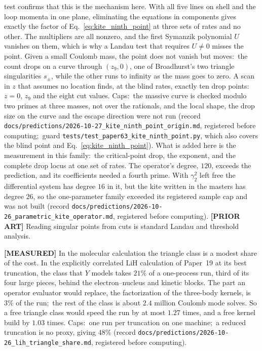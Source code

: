 \documentclass[aps,pra,twocolumn,superscriptaddress,longbibliography]{revtex4-2}
\begin{document}
test confirms that this is the mechanism here.  With all five lines on shell
and the loop momenta in one plane, eliminating the equations in components
gives exactly the factor of Eq.~\eqref{eq:kite_ninth_point} at three sets of
rates and no other.  The multipliers are all nonzero, and the first Symanzik
polynomial $U$ vanishes on them, which is why a Landau test that requires
$U\neq0$ misses the point.  Given a small Coulomb mass, the point does not
vanish but moves:\ the count drops on a curve through $(z_9,0)$, one of
Broadhurst's two triangle singularities $s_\pm$, while the other runs to infinity as the
mass goes to zero.  A scan in $z$ that assumes no location finds, at the blind
rates, exactly ten drop points:\ $z=0$, $z_9$ and the eight cut values.  Caps:\
the massive curve is checked modulo two primes at three masses, not over the
rationals, and the local shape, the drop size on the curve and the escape
direction were not run (record
\texttt{docs/predictions/2026-10-27\_kite\_ninth\_point\_origin.md}, registered
before computing;\ guard \texttt{tests/test\_paper63\_kite\_ninth\_point.py}, which also
covers the blind point and Eq.~\eqref{eq:kite_ninth_point}).  What is added here is the measurement in this family:\ the
critical-point drop, the exponent, and the complete drop locus at one set of
rates.  The operator's degree,
$120$, exceeds the prediction, and its coefficients needed a fourth prime.
With $\gamma_2^2$ left free the differential system has degree $16$ in it,
but the kite written in the masters has degree $26$, so the one-parameter
family exceeded its registered sample cap and was not built (record
\texttt{docs/predictions/2026-10-26\_parametric\_kite\_operator.md},
registered before computing).  \textbf{[PRIOR ART]} Reading singular points
from cuts is standard Landau and threshold analysis.

\textbf{[MEASURED]} In the molecular calculation the triangle class is a
modest share of the cost.  In the explicitly correlated LiH calculation of
Paper~19 at its best truncation, the class that $Y$ models takes $21\%$ of a
one-process run, third of its four large pieces, behind the electron--nucleus
and kinetic blocks.  The part an operator evaluator would replace, the
factorization of the three-body kernels, is $3\%$ of the run;\ the rest of
the class is about $2.4$ million Coulomb mode solves.  So a free triangle
class would speed the run by at most $1.27$ times, and a free kernel build by
$1.03$ times.  Caps:\ one run per truncation on one machine;\ a reduced
truncation is no proxy, giving $48\%$ (record
\texttt{docs/predictions/2026-10-26\_lih\_triangle\_share.md}, registered
before computing).
\end{document}

